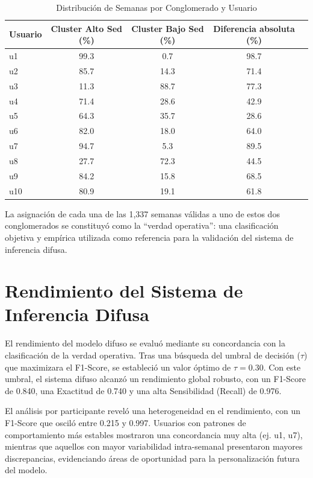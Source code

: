 \begin{table}[htbp]
\centering
\caption{Distribución de Semanas por Conglomerado y Usuario}
\label{tab:distribucion_clusters_usuario}
\small
\begin{tabular}{@{}lcccr@{}}
\toprule
\textbf{Usuario} & \textbf{Cluster Alto Sed (\%)} & \textbf{Cluster Bajo Sed (\%)} & \textbf{Diferencia absoluta (\%)} \\
\midrule
u1  & 99.3 & 0.7  & 98.7 \\
u2  & 85.7 & 14.3 & 71.4 \\
u3  & 11.3 & 88.7 & 77.3 \\
u4  & 71.4 & 28.6 & 42.9 \\
u5  & 64.3 & 35.7 & 28.6 \\
u6  & 82.0 & 18.0 & 64.0 \\
u7  & 94.7 & 5.3  & 89.5 \\
u8  & 27.7 & 72.3 & 44.5 \\
u9  & 84.2 & 15.8 & 68.5 \\
u10 & 80.9 & 19.1 & 61.8 \\
\bottomrule
\end{tabular}
\end{table}

La asignación de cada una de las 1,337 semanas válidas a uno de estos dos conglomerados se constituyó como la ``verdad operativa'': una clasificación objetiva y empírica utilizada como referencia para la validación del sistema de inferencia difusa.

\section{Rendimiento del Sistema de Inferencia Difusa}
\label{sec:rendimiento_sistema_difuso}

El rendimiento del modelo difuso se evaluó mediante su concordancia con la clasificación de la verdad operativa. Tras una búsqueda del umbral de decisión ($\tau$) que maximizara el F1-Score, se estableció un valor óptimo de $\tau = 0.30$. Con este umbral, el sistema difuso alcanzó un rendimiento global robusto, con un F1-Score de 0.840, una Exactitud de 0.740 y una alta Sensibilidad (Recall) de 0.976.

El análisis por participante reveló una heterogeneidad en el rendimiento, con un F1-Score que osciló entre 0.215 y 0.997. Usuarios con patrones de comportamiento más estables mostraron una concordancia muy alta (ej. u1, u7), mientras que aquellos con mayor variabilidad intra-semanal presentaron mayores discrepancias, evidenciando áreas de oportunidad para la personalización futura del modelo.

